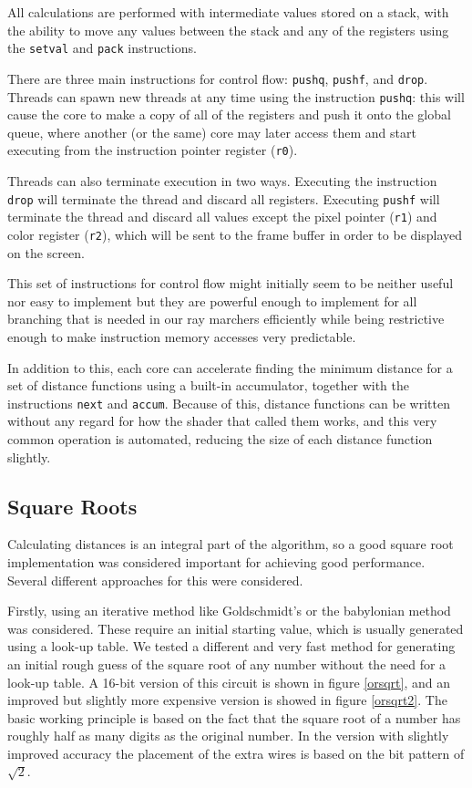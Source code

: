 			All calculations are performed with intermediate values stored on a
			stack, with the ability to move any values between the stack and
			any of the registers using the \texttt{setval} and \texttt{pack}
			instructions.

			There are three main instructions for control flow: \texttt{pushq},
			\texttt{pushf}, and \texttt{drop}. Threads can spawn new threads at
			any time using the instruction \texttt{pushq}: this will cause the
			core to make a copy of all of the registers and push it onto the
			global queue, where another (or the same) core may later access
			them and start executing from the instruction pointer register
			(\texttt{r0}).

			Threads can also terminate execution in two ways. Executing the
			instruction \texttt{drop} will terminate the thread and discard all
			registers. Executing \texttt{pushf} will terminate the thread and
			discard all values except the pixel pointer (\texttt{r1}) and color
			register (\texttt{r2}), which will be sent to the frame buffer in
			order to be displayed on the screen.

			This set of instructions for control flow might initially seem to
			be neither useful nor easy to implement but they are powerful
			enough to implement for all branching that is needed in our ray
			marchers efficiently while being restrictive enough to make
			instruction memory accesses very predictable.

			In addition to this, each core can accelerate finding the minimum 
			distance for a set of distance functions using a built-in 
			accumulator, together with the instructions \texttt{next} and 
			\texttt{accum}. Because of this, distance functions can be written
			without any regard for how the shader that called them works, and
			this very common operation is automated, reducing the size of each
			distance function slightly.

		\subsection{Square Roots}

			Calculating distances is an integral part of the algorithm, so a
			good square root implementation was considered important for
			achieving good performance. Several different approaches for this
			were considered.

			Firstly, using an iterative method like Goldschmidt's or the
			babylonian method was considered. These require an initial starting
			value, which is usually generated using a look-up table. We tested
			a different and very fast method for generating an initial rough
			guess of the square root of any number without the need for a
			look-up table. A 16-bit version of this circuit is shown in figure
			\ref{orsqrt}, and an improved but slightly more expensive version
			is showed in figure \ref{orsqrt2}. The basic working principle is
			based on the fact that the square root of a number has roughly half
			as many digits as the original number. In the version with slightly
			improved accuracy the placement of the extra wires is based on the
			bit pattern of $\sqrt{2}$.

